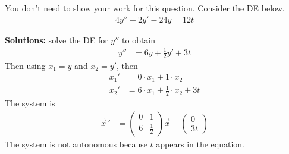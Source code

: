 \ifnum {}
\question[2] You don't need to show your work for this question. Consider the DE below.
\begin{align*}
    4y'' - 2y' - 24y = 12t
\end{align*}
\ifnum {} {\color{DarkBlue} 
\textbf{Solutions:} solve the DE for $y''$ to obtain
\begin{align}
    y'' &= 6 y + \frac12 y' + 3t
\end{align}
Then using $x_1 = y$ and $x_2 = y'$, then 
\begin{align}
    x_1 ' &= 0\cdot x_1 + 1\cdot x_2 \\
    x_2' &=  6\cdot x_1 + \frac12 \cdot x_2 + 3t
\end{align}
The system is
\begin{align}
    \vec x \, ' &= \begin{pmatrix} 0&1\\6&\frac12 \end{pmatrix} \vec x + \begin{pmatrix} 0\\3t\end{pmatrix}
\end{align}
The system is not autonomous because $t$ appears in the equation. 
} 
\else 
\fi
\fi 





